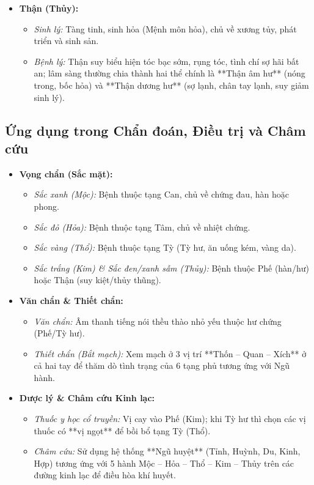 \begin{itemize}
    \item \textbf{Thận (Thủy):}
    \begin{itemize}
        \item \textit{Sinh lý:} Tàng tinh, sinh hỏa (Mệnh môn hỏa), chủ về xương tủy, phát triển và sinh sản.
        \item \textit{Bệnh lý:} Thận suy biểu hiện tóc bạc sớm, rụng tóc, tình chí sợ hãi bất an; lâm sàng thường chia thành hai thể chính là **Thận âm hư** (nóng trong, bốc hỏa) và **Thận dương hư** (sợ lạnh, chân tay lạnh, suy giảm sinh lý).
    \end{itemize}
\end{itemize}

\subsection{Ứng dụng trong Chẩn đoán, Điều trị và Châm cứu}

\begin{itemize}
    \item \textbf{Vọng chẩn (Sắc mặt):}
    \begin{itemize}
        \item \textit{Sắc xanh (Mộc):} Bệnh thuộc tạng Can, chủ về chứng đau, hàn hoặc phong.
        \item \textit{Sắc đỏ (Hỏa):} Bệnh thuộc tạng Tâm, chủ về nhiệt chứng.
        \item \textit{Sắc vàng (Thổ):} Bệnh thuộc tạng Tỳ (Tỳ hư, ăn uống kém, vàng da).
        \item \textit{Sắc trắng (Kim) \& Sắc đen/xanh sẫm (Thủy):} Bệnh thuộc Phế (hàn/hư) hoặc Thận (suy kiệt/thủy thũng).
    \end{itemize}

    \item \textbf{Văn chẩn \& Thiết chẩn:}
    \begin{itemize}
        \item \textit{Văn chẩn:} Âm thanh tiếng nói thều thào nhỏ yếu thuộc hư chứng (Phế/Tỳ hư).
        \item \textit{Thiết chẩn (Bắt mạch):} Xem mạch ở 3 vị trí **Thốn -- Quan -- Xích** ở cả hai tay để thăm dò tình trạng của 6 tạng phủ tương ứng với Ngũ hành.
    \end{itemize}

    \item \textbf{Dược lý \& Châm cứu Kinh lạc:}
    \begin{itemize}
        \item \textit{Thuốc y học cổ truyền:} Vị cay vào Phế (Kim); khi Tỳ hư thì chọn các vị thuốc có **vị ngọt** để bồi bổ tạng Tỳ (Thổ).
        \item \textit{Châm cứu:} Sử dụng hệ thống **Ngũ huyệt** (Tỉnh, Huỳnh, Du, Kinh, Hợp) tương ứng với 5 hành Mộc -- Hỏa -- Thổ -- Kim -- Thủy trên các đường kinh lạc để điều hòa khí huyết.
    \end{itemize}
\end{itemize}

